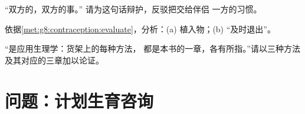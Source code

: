 \begin{exercise}[$\star\star$]\label{exo:g8:contraception:10}
“双方的，双方的事。”
请为这句话辩护，反驳把交给伴侣
一方的习惯。
\end{exercise}

\begin{exercise}[$\star\star$]\label{exo:g8:contraception:11}
依据\cref{met:g8:contraception:evaluate}，分析：(a) 
植入物；(b) “及时退出”。
\end{exercise}

\begin{exercise}[$\star\star\star$]\label{exo:g8:contraception:12}
“是应用生理学：货架上的每种方法，
都是本书的一章，各有所指。”请以三种方法
及其对应的三章加以论证。
\end{exercise}

\section{问题：计划生育咨询}

